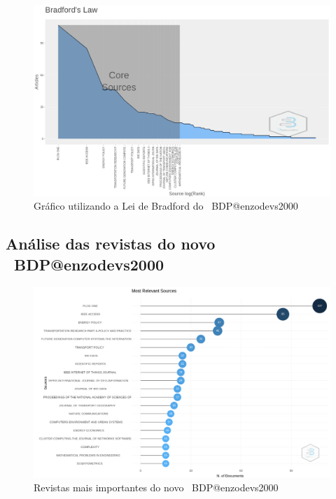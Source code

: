 \begin{figure}[H]
    \centering
    \includegraphics[width=1\textwidth]{experiments/enzodevs2000/AnaliseBibliometrica/BigDataInPolicy/Figures/bradfords_law.png}
    \caption{Gráfico utilizando a Lei de Bradford do \dataset\ BDP@enzodevs2000}
    \label{fig:enzodevs2000:BDP:bradford_dataset}
\end{figure}

\subsection{Análise das revistas do novo \dataset\ BDP@enzodevs2000}

\begin{figure}[H]
    \centering
    \includegraphics[width=1\textwidth]{experiments/enzodevs2000/AnaliseBibliometrica/BigDataInPolicy/Figures/Graficos/NovoDataset/Sources/most_relev_sources.png}
    \caption{Revistas mais importantes do novo \dataset\ BDP@enzodevs2000}
    \label{fig:enzodevs2000:BDP:newdataset:most_relev_sourc}
\end{figure}

